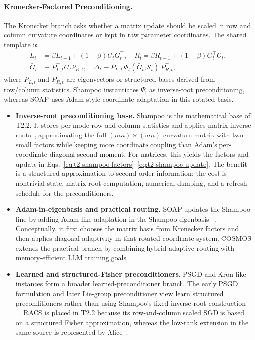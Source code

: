 \paragraph{Kronecker-Factored Preconditioning.}
\label{sec:t2-kronecker}

The Kronecker branch asks whether a matrix update should be scaled in row and
column curvature coordinates or kept in raw parameter coordinates.  The shared
template is
\begin{align}
  L_t &= \beta L_{t-1}+(1-\beta)G_tG_t^\top,\quad
  R_t = \beta R_{t-1}+(1-\beta)G_t^\top G_t, \\
  \bar{G}_t &= P_{L,t}^\top G_t P_{R,t},\quad
  \Delta_t = P_{L,t}\,\Psi_t(\bar{G}_t;\mathcal{S}_t)\,P_{R,t}^\top,
  \label{eq:t2-kronecker-adaptive-template}
\end{align}
where $P_{L,t}$ and $P_{R,t}$ are eigenvectors or structured bases derived
from row/column statistics.  Shampoo instantiates $\Psi_t$ as inverse-root
preconditioning, whereas SOAP uses Adam-style coordinate adaptation in this
rotated basis.
\begin{itemize}
  \setlength{\itemsep}{2pt}
  \item \textbf{Inverse-root preconditioning base.}  Shampoo is the
  mathematical base of T2.2.  It stores per-mode row and column statistics and
  applies matrix inverse roots~\citep{gupta2018shampoo}, approximating the full
  $(mn)\times(mn)$ curvature matrix with two small factors while keeping more
  coordinate coupling than Adam's per-coordinate diagonal second moment.  For
  matrices, this yields the factors and update in
  Eqs.~\eqref{eq:t2-shampoo-factors}--\eqref{eq:t2-shampoo-update}.
  The benefit is a structured approximation to second-order information; the
  cost is nontrivial state, matrix-root computation, numerical damping, and a
  refresh schedule for the preconditioners.
  \item \textbf{Adam-in-eigenbasis and practical routing.}  SOAP updates the
  Shampoo line by adding Adam-like adaptation in the Shampoo eigenbasis
  ~\citep{vyas2025soap}.  Conceptually, it first chooses the matrix basis from
  Kronecker factors and then applies diagonal adaptivity in that rotated
  coordinate system.  COSMOS extends the practical branch by combining hybrid
  adaptive routing with memory-efficient LLM training goals
  ~\citep{liu2025cosmos}.
  \item \textbf{Learned and structured-Fisher preconditioners.}  PSGD and
  Kron-like instances form a broader learned-preconditioner branch.  The early
  PSGD formulation and later Lie-group preconditioner view learn structured
  preconditioners rather than using Shampoo's fixed inverse-root construction
  ~\citep{li2017preconditioned,li2022black}.  RACS is placed in T2.2 because its
  row-and-column scaled SGD is based on a structured Fisher approximation,
  whereas the low-rank extension in the same source is represented by
  Alice~\citep{gong2025towards}.
\end{itemize}

